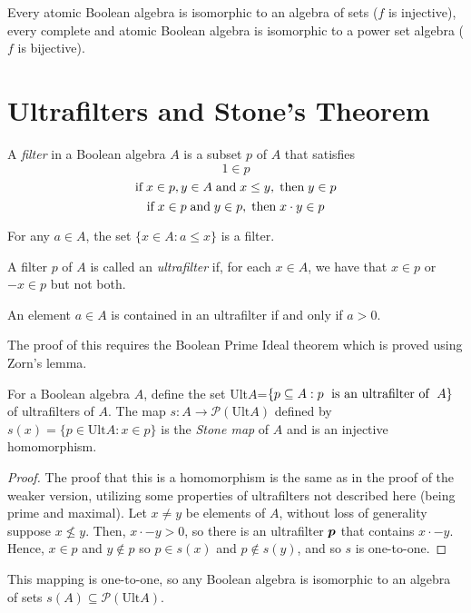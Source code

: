 \documentclass[12pt]{article}
\begin{document}
\begin{corollary}
Every atomic Boolean algebra is isomorphic to an algebra of sets ($f$ is injective), every complete and atomic Boolean algebra is isomorphic to a power set algebra ($f$ is bijective).
\end{corollary}

\section{Ultrafilters and Stone's Theorem}

\begin{definition}
A \textit{filter} in a Boolean algebra $A$ is a subset $p$ of $A$ that satisfies 
\begin{equation*}
    1\in p
\end{equation*}
\begin{equation*}
    \text{if\;} x\in p, y\in A \text{\;and\;} x\le y, \text{\;then\;} y\in p
\end{equation*}
\begin{equation*}
    \text{if\;} x\in p\text{\;and\;}y\in p, \text{\;then\;} x\cdot y\in p
\end{equation*}
\end{definition}

\begin{example}
For any $a\in A$, the set $\{x\in A: a\le x\}$ is a filter.
\end{example}

\begin{definition}
A filter $p$ of $A$ is called an \textit{ultrafilter} if, for each $x\in A$, we have that $x\in p$ or $-x\in p$ but not both.
\end{definition}

\begin{lemma}
An element $a\in A$ is contained in an ultrafilter if and only if $a>0$.
\end{lemma}

The proof of this requires the Boolean Prime Ideal theorem which is proved using Zorn's lemma.

\begin{theorem}
For a Boolean algebra $A$, define the set Ult$A$=$\{p\subseteq A: p \text{\; is an ultrafilter of \;} A\}$ of ultrafilters of $A$.
The map $s: A\to \mathcal{P}(\text{Ult}A)$ defined by $s(x)=\{p\in \text{Ult}A: x\in p\}$ is the \textit{Stone map} of $A$ and is an injective homomorphism.
\end{theorem}
\begin{proof}
The proof that this is a homomorphism is the same as in the proof of the weaker version, utilizing some properties of ultrafilters not described here (being prime and maximal).
Let $x\neq y$ be elements of $A$, without loss of generality suppose $x\not\le y$. 
Then, $x\cdot -y>0$, so there is an ultrafilter ${\boldsymbol p}$ that contains $x\cdot -y$.
Hence, $x\in p$ and $y\not\in p$ so $p\in s(x)$ and $p\not\in s(y)$, and so $s$ is one-to-one.
\end{proof}
This mapping is one-to-one, so any Boolean algebra is isomorphic to an algebra of sets $s(A)\subseteq \mathcal{P}(\text{Ult}A)$.
\end{document}
